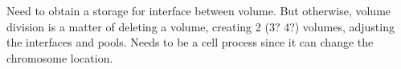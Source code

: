 \textcolor[rgb]{1.00,0.00,0.00}{Need to obtain a storage for interface between volume. But otherwise, volume division is a matter of deleting a volume, creating 2 (3? 4?) volumes, adjusting the interfaces and pools. Needs to be a cell process since it can change the chromosome location.} 